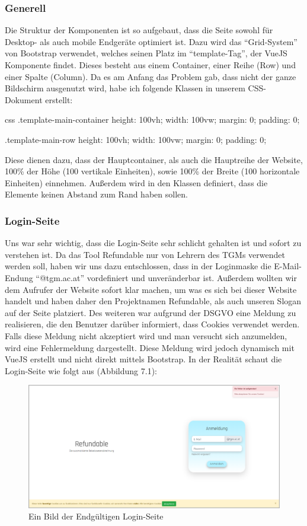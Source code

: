 \subsubsection{Generell}
Die Struktur der Komponenten ist so aufgebaut, dass die Seite sowohl für Desktop- als auch mobile Endgeräte optimiert ist. Dazu wird das \enquote{Grid-System} von Bootstrap verwendet, welches seinen Platz im \enquote{template-Tag}, der VueJS Komponente findet. Dieses besteht aus einem Container, einer Reihe (Row) und einer Spalte (Column). Da es am Anfang das Problem gab, dass nicht der ganze Bildschirm ausgenutzt wird, habe ich folgende Klassen in unserem CSS-Dokument erstellt:
\begin{code}{css}
	.template-main-container {
		height: 100vh;
		width: 100vw;
		margin: 0;
		padding: 0;
	}
	
	.template-main-row {
		height: 100vh;
		width: 100vw;
		margin: 0;
		padding: 0;
	}
\end{code}
Diese dienen dazu, dass der Hauptcontainer, als auch die Hauptreihe der Website, 100\% der Höhe (100 vertikale Einheiten), sowie 100\% der Breite (100 horizontale Einheiten) einnehmen. Außerdem wird in den Klassen definiert, dass die Elemente keinen Abstand zum Rand haben sollen.
\newpage
\subsubsection{Login-Seite}
Uns war sehr wichtig, dass die Login-Seite sehr schlicht gehalten ist und sofort zu verstehen ist. Da das Tool Refundable nur von Lehrern des TGMs verwendet werden soll, haben wir uns dazu entschlossen, dass in der Loginmaske die E-Mail-Endung \enquote{@tgm.ac.at} vordefiniert und unveränderbar ist. Außerdem wollten wir dem Aufrufer der Website sofort klar machen, um was es sich bei dieser Website handelt und haben daher den Projektnamen Refundable, als auch unseren Slogan auf der Seite platziert. Des weiteren war aufgrund der DSGVO eine Meldung zu realisieren, die den Benutzer darüber informiert, dass Cookies verwendet werden. Falls diese Meldung nicht akzeptiert wird und man versucht sich anzumelden, wird eine Fehlermeldung dargestellt. Diese Meldung wird jedoch dynamisch mit VueJS erstellt und nicht direkt mittels Bootstrap. In der Realität schaut die Login-Seite wie folgt aus (Abbildung 7.1):
\begin{figure}[H]
	\centering
	\includegraphics[width=1\linewidth]{images/website/login}
	\caption[Login]{Ein Bild der Endgültigen Login-Seite}
	\label{fig:login}
\end{figure}
